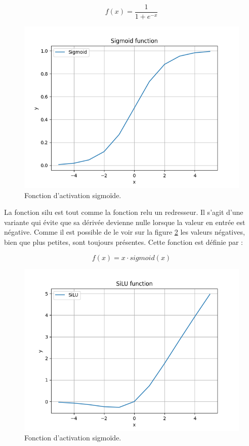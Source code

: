 \[f(x)=\frac{1}{1+e^{-x}}\]

\begin{figure}[hbt!]
    \centering
    \includegraphics[scale=0.6]{Figures/activation_functions/sigmoid.png}
    \caption{Fonction d'activation sigmoïde.}
    \label{fig:activation_functions_sigmoid}
\end{figure}

La fonction \acrfull{silu} est tout comme la fonction \acrshort{relu} un redresseur. Il s'agit d'une variante qui évite que sa dérivée devienne nulle lorsque la valeur en entrée est négative. Comme il est possible de le voir sur la figure \ref{fig:activation_functions_silu} les valeurs négatives, bien que plus petites, sont toujours présentes. Cette fonction est définie par :

\[f(x)=x \cdot sigmoid(x)\]

\begin{figure}[hbt!]
    \centering
    \includegraphics[scale=0.6]{Figures/activation_functions/silu.png}
    \caption{Fonction d'activation sigmoïde.}
    \label{fig:activation_functions_silu}
\end{figure}

